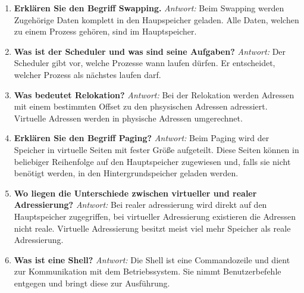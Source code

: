 \begin{enumerate}[label=\arabic*.]
    \item \textbf{Erklären Sie den Begriff Swapping.} \newline
          \textit{Antwort:} Beim Swapping werden Zugehörige Daten komplett in den Haupspeicher geladen. Alle Daten,
          welchen zu einem Prozess gehören, sind im Hauptspeicher.

    \item \textbf{Was ist der Scheduler und was sind seine Aufgaben?} \newline
          \textit{Antwort:} Der Scheduler gibt vor, welche Prozesse wann laufen dürfen. Er entscheidet, welcher
          Prozess als nächstes laufen darf.

    \item \textbf{Was bedeutet Relokation?} \newline
          \textit{Antwort:} Bei der Relokation werden Adressen mit einem bestimmten Offset zu den phsysischen Adressen
          adressiert. Virtuelle Adressen werden in physische Adressen umgerechnet.

    \item \textbf{Erklären Sie den Begriff Paging?} \newline
          \textit{Antwort:} Beim Paging wird der Speicher in virtuelle Seiten mit fester Größe aufgeteilt.
          Diese Seiten können in beliebiger Reihenfolge auf den Hauptspeicher zugewiesen und, falls sie nicht
          benötigt werden, in den Hintergrundspeicher geladen werden.

    \item \textbf{Wo liegen die Unterschiede zwischen virtueller und realer Adressierung?} \newline
          \textit{Antwort:} Bei realer adressierung wird direkt auf den Hauptspeicher zugegriffen, bei virtueller
          Adressierung existieren die Adressen nicht reale. Virtuelle Adressierung besitzt meist viel mehr Speicher
          als reale Adressierung.

    \item \textbf{Was ist eine Shell?} \newline
          \textit{Antwort:} Die Shell ist eine Commandozeile und dient zur Kommunikation mit dem Betriebssystem.
          Sie nimmt Benutzerbefehle entgegen und bringt diese zur Ausführung.


\end{enumerate}
